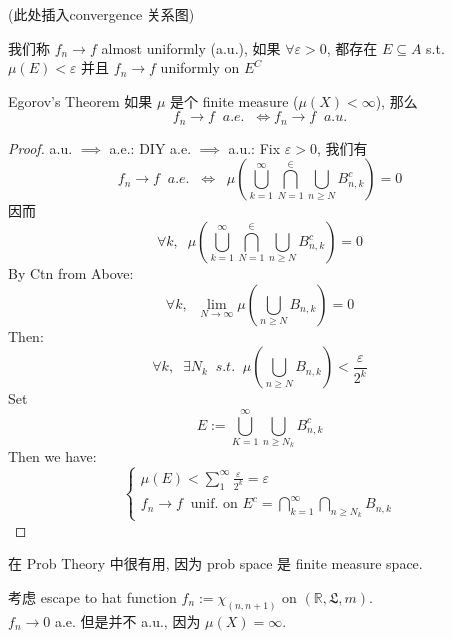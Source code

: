 \documentclass[lang=cn,11pt]{elegantbook}
\begin{document}
(此处插入convergence 关系图)




\begin{definition}
    我们称 $f_n\rightarrow f$ almost uniformly (a.u.), 如果 $\forall \varepsilon > 0$, 都存在 $E \subseteq A$ s.t. $\mu(E) < \varepsilon$ 并且    $f_n \rightarrow f$ uniformly on $E^C$
\end{definition}



\begin{theorem}{Egorov's Theorem}
\label{Egorov's Theorem}
如果 $\mu$ 是个 finite measure ($\mu(X) < \infty$), 那么 
\[
f_n \rightarrow f \;\;a.e. \;\; \Longleftrightarrow f_n \rightarrow f \;\; a.u.
\]
\end{theorem}
\begin{proof}
    a.u. $\implies$ a.e.: DIY
    a.e. $\implies$ a.u.: Fix $\varepsilon > 0$, 我们有 \[
    f_n \rightarrow f \;\; a.e. \;\; \Longleftrightarrow \;\; \mu( \bigcup_{k=1}^\infty \bigcap_{N=1}^\in \bigcup_{n \geq N} B_{n,k}^c)  = 0
    \]
    因而 \[
    \forall k, \;\; \mu( \bigcup_{k=1}^\infty \bigcap_{N=1}^\in \bigcup_{n \geq N} B_{n,k}^c) =0 
    \]
    By Ctn from Above: \[
    \forall k,\;\;  \lim_{N\rightarrow \infty} \mu(\bigcup_{n\geq N} B_{n,k}) = 0
    \]
    Then: \[
    \forall k,\;\; \exists N_k \;\;s.t. \;\;  \mu(\bigcup_{n\geq N} B_{n,k}) < \frac{\varepsilon}{2^k}
    \]
    Set\[
    E:= \bigcup_{K=1}^\infty \bigcup_{n\geq N_k} B_{n,k}^c
    \]
    Then we have: \[
    \begin{cases}
        \mu(E) < \sum_{1}^\infty \frac{\varepsilon}{2^k} = \varepsilon \\
        f_n \rightarrow f \;\;\text{unif. on } E^c = \bigcap_{k=1}^\infty \bigcap_{n\geq N_k} B_{n,k}
    \end{cases}
    \]
\end{proof}
\begin{remark}
    在 Prob Theory 中很有用, 因为 prob space 是 finite measure space.
\end{remark}

\begin{example}
    考虑 escape to hat function $f_n := \chi_{(n,n+1)}$ on $(\mathbb{R}, \mathfrak{L},m)$.\\
    $f_n \rightarrow 0$ a.e. 但是并不 a.u., 因为 $\mu(X) = \infty$.
\end{example}
\end{document}
